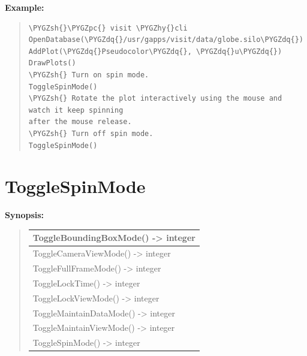 \documentclass[letterpaper,10pt,english]{sphinxmanual}
\def\PYGZsh{\char`\#}
\def\PYGZpc{\char`\%}
\def\PYGZhy{\char`\-}
\def\PYGZdq{\char`\"}
\begin{document}
\begin{DUlineblock}{0em}
\item[] \textbf{Example:}
\item[] 
\end{DUlineblock}
\begin{quote}

\begin{Verbatim}[commandchars=\\\{\}]
\PYGZsh{}\PYGZpc{} visit \PYGZhy{}cli
OpenDatabase(\PYGZdq{}/usr/gapps/visit/data/globe.silo\PYGZdq{})
AddPlot(\PYGZdq{}Pseudocolor\PYGZdq{}, \PYGZdq{}u\PYGZdq{})
DrawPlots()
\PYGZsh{} Turn on spin mode.
ToggleSpinMode()
\PYGZsh{} Rotate the plot interactively using the mouse and watch it keep spinning
after the mouse release.
\PYGZsh{} Turn off spin mode.
ToggleSpinMode()
\end{Verbatim}
\end{quote}


\section{ToggleSpinMode}
\label{functions:togglespinmode}
\begin{DUlineblock}{0em}
\item[] \textbf{Synopsis:}
\end{DUlineblock}
\begin{quote}

\begin{tabulary}{\linewidth}{|L|}
\hline

ToggleBoundingBoxMode() -\textgreater{} integer
\\
\hline
ToggleCameraViewMode() -\textgreater{} integer
\\
\hline
ToggleFullFrameMode() -\textgreater{} integer
\\
\hline
ToggleLockTime() -\textgreater{} integer
\\
\hline
ToggleLockViewMode() -\textgreater{} integer
\\
\hline
ToggleMaintainDataMode() -\textgreater{} integer
\\
\hline
ToggleMaintainViewMode() -\textgreater{} integer
\\
\hline
ToggleSpinMode() -\textgreater{} integer
\\
\hline\end{tabulary}

\end{quote}
\end{document}
